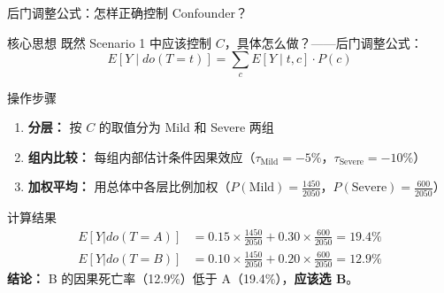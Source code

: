 \begin{frame}[allowframebreaks]{后门调整公式：怎样正确控制 Confounder？}

  \begin{block}{核心思想}
    既然 Scenario 1 中应该控制 $C$，具体怎么做？——后门调整公式：
    $$E[Y \mid do(T=t)] = \sum_c E[Y \mid t, c] \cdot P(c)$$
  \end{block}

  \begin{block}{操作步骤}
    \begin{enumerate}
      \item \textbf{分层：} 按 $C$ 的取值分为 Mild 和 Severe 两组
      \item \textbf{组内比较：} 每组内部估计条件因果效应（$\tau_{\text{Mild}}=-5\%$，$\tau_{\text{Severe}}=-10\%$）
      \item \textbf{加权平均：} 用总体中各层比例加权（$P(\text{Mild})=\frac{1450}{2050}$，$P(\text{Severe})=\frac{600}{2050}$）
    \end{enumerate}
  \end{block}

  \begin{exampleblock}{计算结果}
    \begin{align*}
      E[Y|do(T=A)] &= 0.15 \times \tfrac{1450}{2050} + 0.30 \times \tfrac{600}{2050} = 19.4\% \\
      E[Y|do(T=B)] &= 0.10 \times \tfrac{1450}{2050} + 0.20 \times \tfrac{600}{2050} = 12.9\%
    \end{align*}
    \textbf{结论：} B 的因果死亡率（12.9\%）低于 A（19.4\%），\textbf{应该选 B}。
  \end{exampleblock}

\end{frame}


